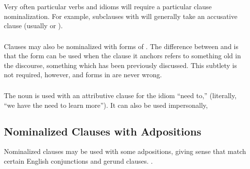\subsubsection{} Very often particular verbs and idioms will require a
particular clause nominalization.  For example, subclauses with
  will generally take an accusative clause (usually
 or ).

\subsubsection{} Clauses may also be nominalized with forms of
.  The difference between  and  is that the
 form can be used when the clause it anchors refers to
something old in the discourse, something which has been previously
discussed.  This subtlety is not required, however, and forms in
 are never wrong. 

\subsubsection{} The noun   is used with an
attributive clause for the idiom ``need to,''   (literally, ``we have the need
to learn more''). 
It can also be used impersonally,  


\subsection{Nominalized Clauses with Adpositions} Nominalized clauses
may be used with some adpositions, giving sense that match certain
English conjunctions and gerund clauses.   .\label{syn:rel:nom-adp}


\subsubsection{}  




